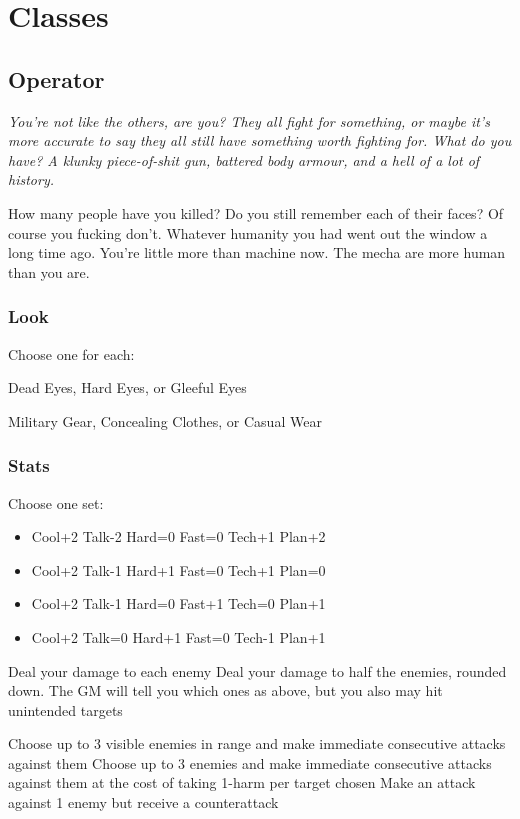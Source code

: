 \section{Classes}

\subsection{Operator}
{\itshape You're not like the others, are you? They all fight for something, or maybe it's more accurate to say they all still have something worth fighting for. What do you have? A klunky piece-of-shit gun, battered body armour, and a hell of a lot of history. 

How many people have you killed? Do you still remember each of their faces? Of course you fucking don't. Whatever humanity you had went out the window a long time ago. You're little more than machine now. The mecha are more human than you are.}

\subsubsection{Look}

Choose one for each:

Dead Eyes, Hard Eyes, or Gleeful Eyes

Military Gear, Concealing Clothes, or Casual Wear

\subsubsection{Stats}
Choose one set:
\begin{itemize}
\setlength\itemsep{0em}
\item Cool+2 Talk-2 Hard=0 Fast=0 Tech+1 Plan+2
\item Cool+2 Talk-1 Hard+1 Fast=0 Tech+1 Plan=0
\item Cool+2 Talk-1 Hard=0 Fast+1 Tech=0 Plan+1
\item Cool+2 Talk=0 Hard+1 Fast=0 Tech-1 Plan+1
\end{itemize}

{Deal your damage to each enemy}
{Deal your damage to half the enemies, rounded down. The GM will tell you which ones}
{as above, but you also may hit unintended targets}

{Choose up to 3 visible enemies in range and make immediate consecutive attacks against them}
{Choose up to 3 enemies and make immediate consecutive attacks against them at the cost of taking 1-harm per target chosen}
{Make an attack against 1 enemy but receive a counterattack}

